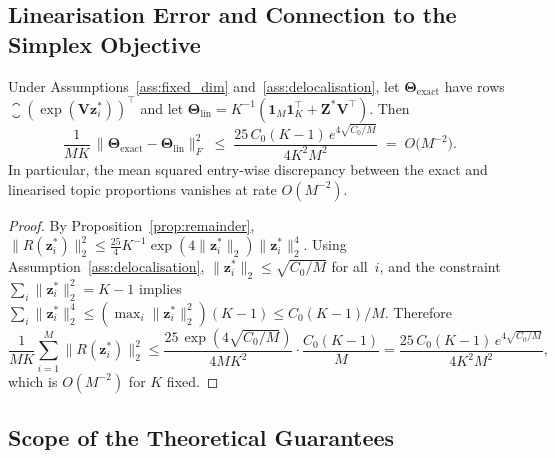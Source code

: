 \subsection{Linearisation Error and Connection to the Simplex Objective}
\label{subsec:linearisation_error}

\begin{proposition}
\label{prop:linearisation_error}
Under Assumptions~\ref{ass:fixed_dim} and~\ref{ass:delocalisation},
let $\boldsymbol{\Theta}_{\mathrm{exact}}$ have rows
$\closure(\exp(\mathbf{V}\mathbf{z}_i^*))^{\!\top}$ and let
$\boldsymbol{\Theta}_{\mathrm{lin}}
= K^{-1}(\mathbf{1}_M\mathbf{1}_K^{\!\top}
+ \mathbf{Z}^*\mathbf{V}^{\!\top})$.
Then
\begin{equation}
  \frac{1}{MK}\,
  \bigl\|\boldsymbol{\Theta}_{\mathrm{exact}}
    - \boldsymbol{\Theta}_{\mathrm{lin}}\bigr\|_F^2
  \;\leq\;
  \frac{25\,C_0(K{-}1)\,e^{4\sqrt{C_0/M}}}{4K^2 M^2}
  \;=\;
  O\!\bigl(M^{-2}\bigr).
  \label{eq:linearisation_error}
\end{equation}
In particular, the mean squared entry-wise discrepancy between the exact
and linearised topic proportions vanishes at rate $O(M^{-2})$.
\end{proposition}

\begin{proof}
By Proposition~\ref{prop:remainder},
$\|R(\mathbf{z}_i^*)\|_2^2
 \leq \tfrac{25}{4}K^{-1}
      \exp(4\|\mathbf{z}_i^*\|_2)\|\mathbf{z}_i^*\|_2^4$.
Using Assumption~\ref{ass:delocalisation},
$\|\mathbf{z}_i^*\|_2 \leq \sqrt{C_0/M}$ for all~$i$, and the constraint
$\sum_i\|\mathbf{z}_i^*\|_2^2 = K{-}1$ implies
$\sum_i\|\mathbf{z}_i^*\|_2^4
 \leq (\max_i\|\mathbf{z}_i^*\|_2^2)(K{-}1)
 \leq C_0(K{-}1)/M$.
Therefore
\[
  \frac{1}{MK}\sum_{i=1}^M \|R(\mathbf{z}_i^*)\|_2^2
  \leq \frac{25\,\exp(4\sqrt{C_0/M})}{4MK^2}
       \cdot\frac{C_0(K{-}1)}{M}
  = \frac{25\,C_0(K{-}1)\,e^{4\sqrt{C_0/M}}}{4K^2 M^2},
\]
which is $O(M^{-2})$ for $K$ fixed.
\end{proof}

\subsection{Scope of the Theoretical Guarantees}
\label{subsec:scope}

